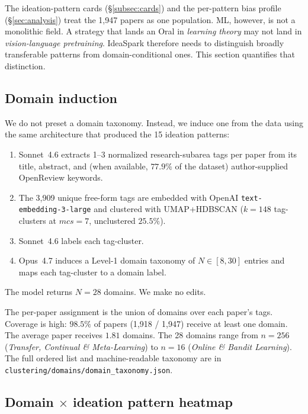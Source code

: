 \documentclass[10pt,a4paper]{article}
\begin{document}
The ideation-pattern cards (\S\ref{subsec:cards}) and the per-pattern bias profile (\S\ref{sec:analysis}) treat the 1{,}947 papers as one population. ML, however, is not a monolithic field. A strategy that lands an Oral in \emph{learning theory} may not land in \emph{vision-language pretraining}. IdeaSpark therefore needs to distinguish broadly transferable patterns from domain-conditional ones. This section quantifies that distinction.

\subsection{Domain induction}
\label{subsec:domain-induction}

We do not preset a domain taxonomy. Instead, we induce one from the data using the same architecture that produced the 15 ideation patterns:

\begin{enumerate}[nosep, leftmargin=1.5em]
\item Sonnet~4.6 extracts 1--3 normalized research-subarea tags per paper from its title, abstract, and (when available, $77.9\%$ of the dataset) author-supplied OpenReview keywords.
\item The 3{,}909 unique free-form tags are embedded with OpenAI \texttt{text-embedding-3-large} and clustered with UMAP+HDBSCAN ($k{=}148$ tag-clusters at $\textit{mcs}{=}7$, unclustered $25.5\%$).
\item Sonnet~4.6 labels each tag-cluster.
\item Opus~4.7 induces a Level-1 domain taxonomy of $N \in [8, 30]$ entries and maps each tag-cluster to a domain label.
\end{enumerate}

The model returns $N{=}28$ domains. We make no edits.

The per-paper assignment is the union of domains over each paper's tags. Coverage is high: $\mathbf{98.5\%}$ of papers (1{,}918 / 1{,}947) receive at least one domain. The average paper receives $1.81$ domains. The 28 domains range from $n{=}256$ (\textit{Transfer, Continual \& Meta-Learning}) to $n{=}16$ (\textit{Online \& Bandit Learning}). The full ordered list and machine-readable taxonomy are in \texttt{clustering/domains/domain\_taxonomy.json}.

\subsection{Domain $\times$ ideation pattern heatmap}
\label{subsec:dm-heatmap}
\end{document}
